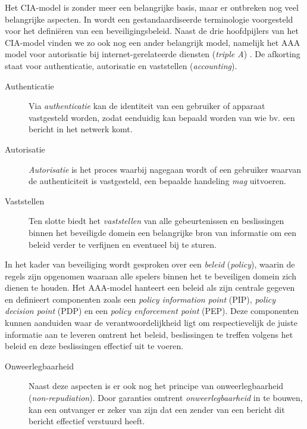 Het CIA-model is zonder meer een belangrijke basis, maar er ontbreken nog veel
belangrijke aspecten. In \citep{rfc:3198} wordt een gestandaardiseerde
terminologie voorgesteld voor het defini\"eren van een beveiligingsbeleid.
Naast de drie hoofdpijlers van het CIA-model vinden we zo ook nog een ander
belangrijk model, namelijk het AAA model voor autorisatie bij
internet-gerelateerde diensten (\emph{triple A}) \citep{rfc:2904}. De afkorting
staat voor authenticatie, autorisatie en vaststellen (\emph{accounting}).

\begin{description}

  \item[Authenticatie] Via \emph{authenticatie} kan de identiteit van een
  gebruiker of apparaat vastgesteld worden, zodat eenduidig kan bepaald worden
  van wie bv. een bericht in het netwerk komt.
  
  \item[Autorisatie] \emph{Autorisatie} is het proces waarbij nagegaan wordt of
  een gebruiker waarvan de authenticiteit is vastgesteld, een bepaalde
  handeling \emph{mag} uitvoeren.
  
  \item[Vaststellen] Ten slotte biedt het \emph{vaststellen} van alle
  gebeurtenissen en beslissingen binnen het beveiligde domein een belangrijke
  bron van informatie om een beleid verder te verfijnen en eventueel bij te
  sturen.

\end{description}

In het kader van beveiliging wordt gesproken over een \emph{beleid}
(\emph{policy}), waarin de regels zijn opgenomen waaraan alle spelers binnen
het te beveiligen domein zich dienen te houden. Het AAA-model hanteert een
beleid als zijn centrale gegeven en definieert componenten zoals een
\emph{policy information point} (PIP), \emph{policy decision point} (PDP) en
een \emph{policy enforcement point} (PEP). Deze componenten kunnen aanduiden
waar de verantwoordelijkheid ligt om respectievelijk de juiste informatie aan
te leveren omtrent het beleid, beslissingen te treffen volgens het beleid en
deze beslissingen effectief uit te voeren.

\begin{description}

  \item[Onweerlegbaarheid] Naast deze aspecten is er ook nog het principe van
  onweerlegbaarheid (\emph{non-repudiation}). Door garanties omtrent
  \emph{onweerlegbaarheid} in te bouwen, kan een ontvanger er zeker van zijn
  dat een zender van een bericht dit bericht effectief verstuurd heeft.

\end{description}

